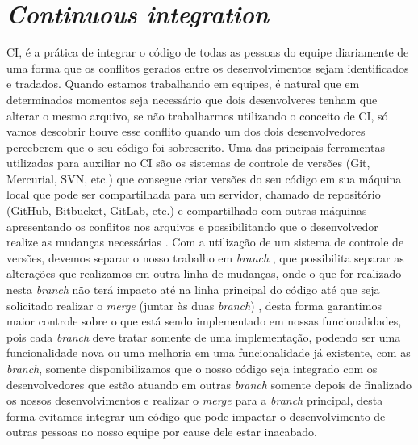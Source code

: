       \section{\textit{Continuous integration}}
        CI, é a prática de integrar o código de todas as pessoas do equipe diariamente
        de uma forma que os conflitos gerados entre os desenvolvimentos sejam
        identificados e tradados. Quando estamos trabalhando em equipes, é natural
        que em determinados momentos seja necessário que dois desenvolveres tenham
        que alterar o mesmo arquivo, se não trabalharmos utilizando o conceito de
        CI, só vamos descobrir houve esse conflito quando um dos dois desenvolvedores
        perceberem que o seu código foi sobrescrito. Uma das principais ferramentas
        utilizadas para auxiliar no CI são os sistemas de controle de versões
        (Git, Mercurial, SVN, etc.) que consegue criar versões do seu
        código em sua máquina local que pode ser compartilhada para um servidor,
        chamado de repositório (GitHub, Bitbucket, GitLab, etc.) e compartilhado
        com outras máquinas apresentando os conflitos nos arquivos e possibilitando
        que o desenvolvedor realize as mudanças necessárias \cite{ProGit}. \newline
        Com a utilização de um sistema de controle de versões, devemos separar o
        nosso trabalho em \textit{branch} \cite{TheDevOpsHandbook}, que possibilita
        separar as alterações que realizamos em outra linha de mudanças, onde
        o que for realizado nesta \textit{branch} não terá impacto até na linha
        principal do código até que seja solicitado realizar o \textit{merge}
        (juntar às duas \textit{branch}) \cite{ProGit}, desta forma garantimos maior
        controle sobre o que está sendo implementado em nossas funcionalidades, pois
        cada \textit{branch} deve tratar somente de uma implementação, podendo ser
        uma funcionalidade nova ou uma melhoria em uma funcionalidade já existente,
        com as \textit{branch}, somente disponibilizamos que o nosso código seja
        integrado com os desenvolvedores que estão atuando em outras \textit{branch}
        somente depois de finalizado os nossos desenvolvimentos e realizar o \textit{merge}
        para a \textit{branch} principal, desta forma evitamos integrar um código
        que pode impactar o desenvolvimento de outras pessoas no nosso equipe por
        cause dele estar inacabado. \newline

